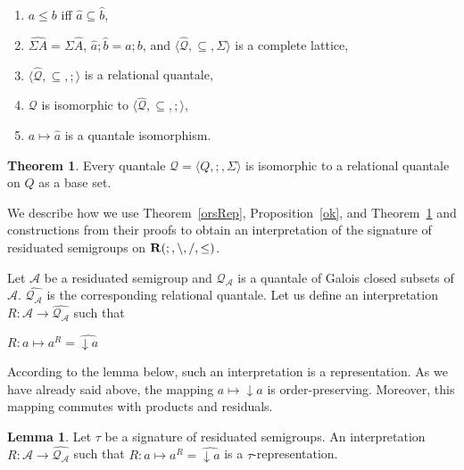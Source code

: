 \documentclass[a4paper]{article}
\theoremstyle{definition}
\theoremstyle{theorem}
\newtheorem{theorem}{Theorem}
\theoremstyle{proposition}
\theoremstyle{lemma}
\newtheorem{lemma}{Lemma}
\theoremstyle{ex}
\theoremstyle{corollary}
\theoremstyle{claim}
\begin{document}
\begin{enumerate}
\item $a \leq b$ iff $\hat{a} \subseteq \hat{b}$,

\item $\widehat{\Sigma A} = \Sigma \widehat{A}$, $\hat{a} ; \hat{b} = \widehat{a ; b}$, and $\langle \widehat{\mathcal{Q}}, \subseteq, \Sigma \rangle$ is a complete lattice,

\item $\langle \widehat{\mathcal{Q}}, \subseteq, ; \rangle$ is a relational quantale,

\item $\mathcal{Q}$ is isomorphic to $\langle \widehat{\mathcal{Q}}, \subseteq, ; \rangle$,

\item $a \mapsto \hat{a}$ is a quantale isomorphism.
\end{enumerate}

\begin{theorem} \label{quantaleRep}
  Every quantale $\mathcal{Q} = \langle Q, ;, \Sigma \rangle$ is isomorphic to a relational quantale on $Q$ as a base set.
\end{theorem}

We describe how we use Theorem~\ref{orsRep}, Proposition~\ref{ok}, and Theorem~\ref{quantaleRep} and constructions from their proofs to obtain an interpretation of the signature of residuated semigroups on ${\bf R}(;, \setminus, /, \leq)$.

Let $\mathcal{A}$ be a residuated semigroup and $\mathcal{Q}_{\mathcal{A}}$ is a quantale of Galois closed subsets of $\mathcal{A}$. $\widehat{\mathcal{Q}_{\mathcal{A}}}$ is the corresponding relational quantale. Let us define an interpretation $R : \mathcal{A} \to \widehat{\mathcal{Q}_{\mathcal{A}}}$ such that

\begin{center}
  $R : a \mapsto a^{R} = \widehat{\downarrow a}$
\end{center}

According to the lemma below, such an interpretation is a representation. As we have already said above, the mapping $a \mapsto \downarrow a$ is order-preserving. Moreover, this mapping commutes with products and residuals.

\begin{lemma}
  Let $\tau$ be a signature of residuated semigroups. An interpretation $R : \mathcal{A} \to \widehat{\mathcal{Q}_{\mathcal{A}}}$ such that $R : a \mapsto a^{R} = \widehat{\downarrow a}$ is a $\tau$-representation.
\end{lemma}
\end{document}
